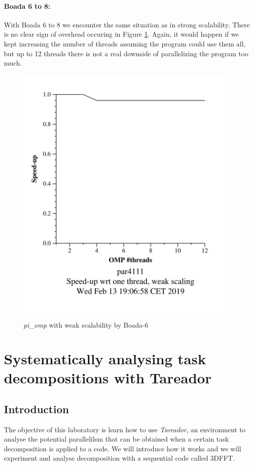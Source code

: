 \documentclass[12]{article}
\begin{document}
\paragraph{Boada 6 to 8:}
With Boada 6 to 8 we encounter the same situation as in strong scalability. There is no clear sign of overhead occuring in Figure \ref{fig:pi_weak_ompboada6}. Again, it would happen if we kept increasing the number of threads assuming the program could use them all, but up to 12 threads there is not a real downside of parallelizing the program too much.
\begin{figure}[H]
\centering
\includegraphics[scale=0.15]{images/pi_omp-100000000-1-12-3-weak-boada-6.png}
 \caption{ \textit{pi\_omp} with weak scalability by Boada-6}
  \label{fig:pi_weak_ompboada6}
\end{figure}

\section{Systematically analysing task decompositions with Tareador}
\subsection{Introduction}
The objective of this laboratory is learn how to use \textit{Tareador}, an environment to analyse the potential parallelilsm that can be obtained when a certain task decomposition is applied to a code. We will introduce how it works and we will experiment and analyse decomposition with a sequential code called 3DFFT.
\end{document}
